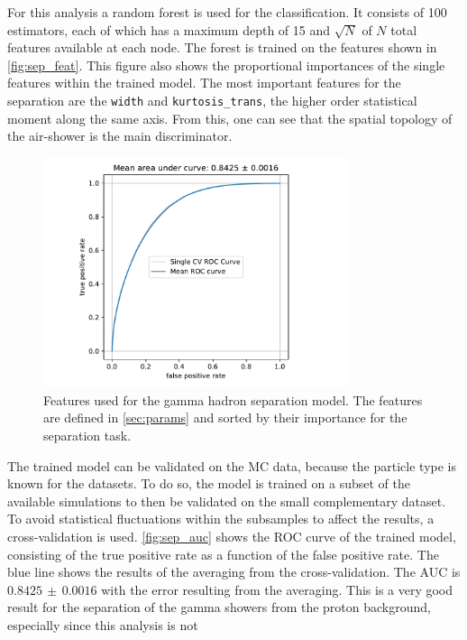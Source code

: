 For this analysis a random forest is used for the classification. It consists
of \num{100} estimators, each of which has a maximum depth of \num{15} and $\sqrt{N}$ of $N$ total features available at each node. The forest is trained on the features shown in \autoref{fig:sep_feat}.
This figure also shows the proportional importances of the single features
within the trained model. The most important features for the separation are
the \texttt{width} and \texttt{kurtosis\_trans}, the higher order statistical
moment along the same axis. From this, one can see that the spatial topology of
the air-shower is the main discriminator.

\begin{figure}
  \centering
  \includegraphics[width=0.8\textwidth, page=4]{Plots/results/DBSCAN/separation_performance.pdf}
  \caption{Features used for the gamma hadron separation model. The features are defined in \autoref{sec:params} and sorted by their importance for the separation task.}
  \label{fig:sep_feat}
\end{figure}
%
The trained model can be validated on the MC data, because the particle type is
known for the datasets. To do so, the model is trained on a subset of the
available simulations to then be validated on the small complementary
dataset. To avoid statistical fluctuations within the subsamples to affect the
results, a cross-validation is used. \autoref{fig:sep_auc} shows the ROC curve
of the trained model, consisting of the true positive rate as a function of the
false positive rate. The blue line shows the results of the averaging from the
cross-validation. The AUC is $0.8425\,\pm\,0.0016$ with the error resulting
from the averaging. This is a very good result for the separation of the gamma
showers from the proton background, especially since this analysis is not
